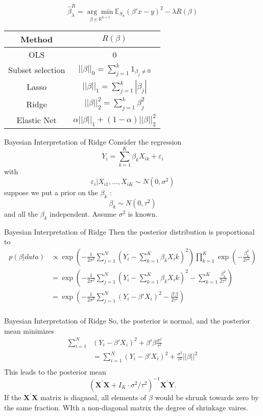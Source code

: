 \documentclass{beamer}
\newcommand{\X}{\mathbf{X}}
\newcommand{\Y}{\mathbf{Y}}
\begin{document}
\begin{frame}
		$$\hat{\beta}_\lambda^R=\underset{\beta \in \mathbb{R}^{k+1}}{\arg\min}\mathbb{E}_{S_n}(\beta'x-y)^2-\lambda R(\beta)$$
		
		\centering
		\begin{tabular}{cc}
			\toprule
			Method&$R(\beta)$\\
			\midrule
			OLS&0\\
			Subset selection&$||\beta||_0=\sum_{j=1}^{k}\mathcal{1}_{\beta_j\neq 0}$\\
			Lasso&$||\beta||_1=\sum_{j=1}^{k}|\beta_j|$\\
			Ridge&$||\beta||_2^2=\sum_{j=1}^{k}\beta_j^2$\\
			Elastic Net&$\alpha||\beta||_1+(1-\alpha)||\beta||^2_2$\\
			\bottomrule
		\end{tabular}
\end{frame}

\begin{frame}{Bayesian Interpretation of Ridge}
Consider the regression
$$Y_i=\sum_{k=1}^{K}\beta_kX_{ik}+\varepsilon_i$$
with
$$\varepsilon_i|X_{i1},...,X_{iK}\sim N(0,\sigma^2)$$
suppose we put a prior on the $\beta_k$ :
$$\beta_k\sim N(0,\tau^2)$$
and all the $\beta_k$ independent. Assume $\sigma^2$ is known.
\end{frame}

\begin{frame}{Bayesian Interpretation of Ridge}
	Then the posterior distribution is proportional to
	\begin{align*}
		p(\beta|data)&\propto \exp\left(-\frac{1}{2\sigma^2}\sum_{j=1}^{N}\left(Y_i-\sum_{k=1}^{K}\beta_kX_ik\right)^2\right)\prod\limits_{k=1}^K\exp\left(-\frac{\beta^2_k}{2\tau^2}\right)\\
		&=\exp\left(-\frac{1}{2\sigma^2}\sum_{j=1}^{N}\left(Y_i-\sum_{k=1}^{K}\beta_kX_ik\right)^2-\sum_{k=1}^{K}\frac{\beta^2_k}{2\tau^2}\right)\\
		&=\exp\left(-\frac{1}{2\sigma^2}\sum_{j=1}^{N}(Y_i-\beta'X_i)^2-\frac{\beta'\beta}{2\tau^2}\right)\\
	\end{align*}
\end{frame}

\begin{frame}{Bayesian Interpretation of Ridge}
	So, the posterior is normal, and the posterior mean minimizes
	\begin{align*}
		\sum_{i=1}^{N}&(Y_i-\beta'X_i)^2+\beta'\beta\frac{\sigma^2}{\tau^2}\\
		&=\sum_{i=1}^{N}(Y_i-\beta'X_i)^2+\frac{\sigma^2}{\tau^2}||\beta||^2\\
	\end{align*}
	This leads to the posterior mean
	$$\left( \X^{'}\X+I_K\cdot\sigma^2/\tau^2\right) ^{-1}\X^{'}\Y.$$
	If the $\X^{'}\X$ matrix is diagnoal, all elements of $\beta$ would be shrunk
	towards zero by the same fraction. WIth a non-diagonal matrix the degree of
	shrinkage vaires.
\end{frame}
\end{document}
